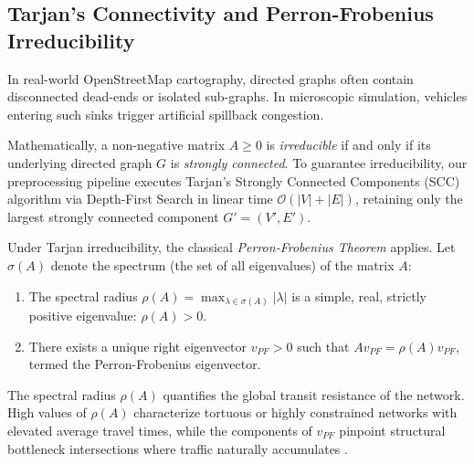 \documentclass[lettersize,journal]{IEEEtran}
\begin{document}
\subsection{Tarjan's Connectivity and Perron-Frobenius Irreducibility}
In real-world OpenStreetMap cartography, directed graphs often contain disconnected dead-ends or isolated sub-graphs. In microscopic simulation, vehicles entering such sinks trigger artificial spillback congestion.

Mathematically, a non-negative matrix $A \ge 0$ is \emph{irreducible} if and only if its underlying directed graph $G$ is \emph{strongly connected}. To guarantee irreducibility, our preprocessing pipeline executes Tarjan's Strongly Connected Components (SCC) algorithm \cite{Tarjan1972} via Depth-First Search in linear time $\mathcal{O}(|V| + |E|)$, retaining only the largest strongly connected component $G' = (V', E')$.

Under Tarjan irreducibility, the classical \emph{Perron-Frobenius Theorem} \cite{Perron1907, Frobenius1912} applies. Let $\sigma(A)$ denote the spectrum (the set of all eigenvalues) of the matrix $A$:
\begin{enumerate}
    \item The spectral radius $\rho(A) = \max_{\lambda \in \sigma(A)} |\lambda|$ is a simple, real, strictly positive eigenvalue: $\rho(A) > 0$.
    \item There exists a unique right eigenvector $v_{PF} > 0$ such that $A v_{PF} = \rho(A) v_{PF}$, termed the Perron-Frobenius eigenvector.
\end{enumerate}
The spectral radius $\rho(A)$ quantifies the global transit resistance of the network. High values of $\rho(A)$ characterize tortuous or highly constrained networks with elevated average travel times, while the components of $v_{PF}$ pinpoint structural bottleneck intersections where traffic naturally accumulates \cite{Cvetkovic1980, Bell2000}.
\end{document}
